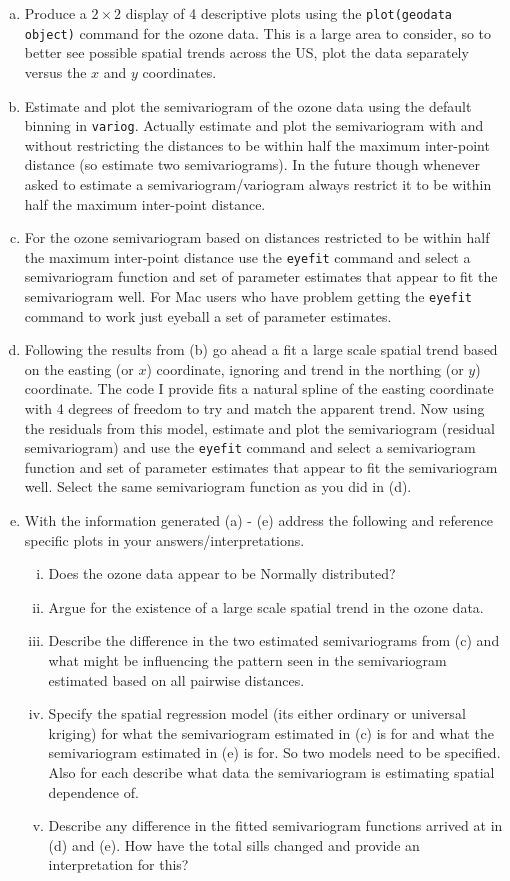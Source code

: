 \documentclass[letterpaper, 12pt]{article}
\begin{document}
\begin{enumerate}[a.]
\item
Produce a $2\times 2$ display of 4 descriptive plots using the \texttt{plot(geodata object)} command for the ozone data. This is a large area to consider, so to better see possible spatial trends across the US, plot the data separately versus the $x$ and $y$ coordinates.
\item
Estimate and plot the semivariogram of the ozone data using the default binning in \texttt{variog}.
Actually estimate and plot the semivariogram with and without restricting the distances to be within half the maximum inter-point distance (so estimate two semivariograms). In the future though whenever asked to estimate a semivariogram/variogram always restrict it to be within half the maximum inter-point distance.
\item
For the ozone semivariogram based on distances restricted to be within half the maximum inter-point distance use the \texttt{eyefit} command and select a semivariogram function and set of parameter estimates that appear to fit the semivariogram well. For Mac users who have problem getting the \texttt{eyefit} command to work just eyeball a set of parameter estimates.
\item
Following the results from (b) go ahead a fit a large scale spatial trend based on the easting (or $x$) coordinate, ignoring and trend in the northing (or $y$) coordinate. 
The code I provide fits a natural spline of the easting coordinate with 4 degrees of freedom to try and match the apparent trend. 
Now using the residuals from this model, estimate and plot the semivariogram (residual semivariogram) and use the \texttt{eyefit} command and select a semivariogram function and set of parameter estimates that appear to fit the semivariogram well. Select the same semivariogram function as you did in (d).
\item
With the information generated (a) - (e) address the following and reference specific plots in your answers/interpretations.
\begin{enumerate}[(i)]
\item
Does the ozone data appear to be Normally distributed?
\item
Argue for the existence of a large scale spatial trend in the ozone data.
\item
Describe the difference in the two estimated semivariograms from (c) and what might be influencing the pattern seen in the semivariogram estimated based on all pairwise distances.
\item
Specify the spatial regression model (its either ordinary or universal kriging) for what the semivariogram estimated in (c) is for and what the semivariogram estimated in (e) is for. 
So two models need to be specified. 
Also for each describe what data the semivariogram is estimating spatial dependence of.
\item
Describe any difference in the fitted semivariogram functions arrived at in (d) and (e). 
How have the total sills changed and provide an interpretation for this?
\end{enumerate}
\end{enumerate}
\end{document}
